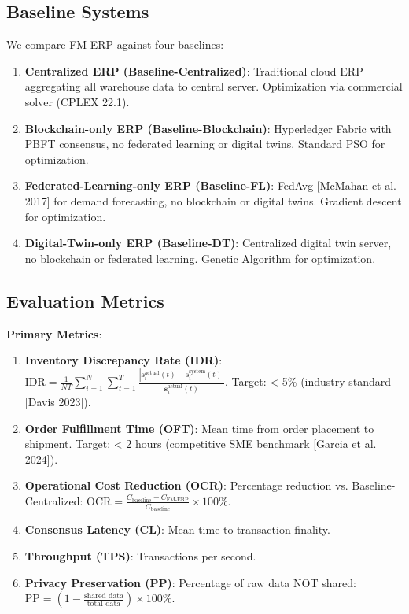 \documentclass[times,10pt,twocolumn]{jucs2e}
\begin{document}
\subsection{Baseline Systems}

We compare FM-ERP against four baselines:

\begin{enumerate}
\item \textbf{Centralized ERP (Baseline-Centralized)}: Traditional cloud ERP aggregating all warehouse data to central server. Optimization via commercial solver (CPLEX 22.1).

\item \textbf{Blockchain-only ERP (Baseline-Blockchain)}: Hyperledger Fabric with PBFT consensus, no federated learning or digital twins. Standard PSO for optimization.

\item \textbf{Federated-Learning-only ERP (Baseline-FL)}: FedAvg [McMahan et al. 2017] for demand forecasting, no blockchain or digital twins. Gradient descent for optimization.

\item \textbf{Digital-Twin-only ERP (Baseline-DT)}: Centralized digital twin server, no blockchain or federated learning. Genetic Algorithm for optimization.
\end{enumerate}

\subsection{Evaluation Metrics}

\textbf{Primary Metrics}:
\begin{enumerate}
\item \textbf{Inventory Discrepancy Rate (IDR)}: $\text{IDR} = \frac{1}{NT} \sum_{i=1}^N \sum_{t=1}^T \frac{|\mathbf{s}_i^{\text{actual}}(t) - \mathbf{s}_i^{\text{system}}(t)|}{\mathbf{s}_i^{\text{actual}}(t)}$. Target: < 5\% (industry standard [Davis 2023]).

\item \textbf{Order Fulfillment Time (OFT)}: Mean time from order placement to shipment. Target: < 2 hours (competitive SME benchmark [Garcia et al. 2024]).

\item \textbf{Operational Cost Reduction (OCR)}: Percentage reduction vs. Baseline-Centralized: $\text{OCR} = \frac{C_{\text{baseline}} - C_{\text{FM-ERP}}}{C_{\text{baseline}}} \times 100\%$.

\item \textbf{Consensus Latency (CL)}: Mean time to transaction finality.

\item \textbf{Throughput (TPS)}: Transactions per second.

\item \textbf{Privacy Preservation (PP)}: Percentage of raw data NOT shared: $\text{PP} = (1 - \frac{\text{shared data}}{\text{total data}}) \times 100\%$.
\end{enumerate}
\end{document}
